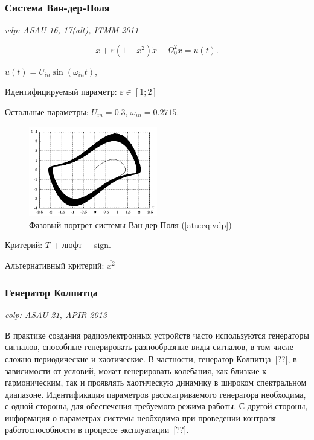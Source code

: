 \documentclass[a4paper,12pt]{article}
\newcommand{\LinkRef}[1]{ \textit{\color{red}#1} }
\begin{document}
\FloatBarrier
\subsubsection{Система Ван-дер-Поля} %

\LinkRef{
  vdp: ASAU-16, 17(alt), ITMM-2011
}

\begin{equation}
 \ddot{x} + \varepsilon (1-x^2)  \dot{x} + \Omega_0^2 x  = u(t) .
\label{atu:eq:vdp}
\end{equation}

\( u(t) = U_{in} \sin ( \omega_{in} t ) \),

Идентифицируемый параметр:
\( \varepsilon \in [1;2]  \)

Остальные параметры:
\(U_{in}=0.3\),
\(\omega_{in}=0.2715\).


\begin{figure}[htb!]
\centerline{\includegraphics[width=0.5\textwidth]{p/cha/vdp_phase.pdf} }
\caption{Фазовый портрет системы Ван-дер-Поля (\ref{atu:eq:vdp})}
\label{atu:f:vdp_phase}
\end{figure}

Критерий:
$\overline{T}$ + люфт + sign.

Альтернативный критерий:
$\overline{x^2}$


\FloatBarrier
\subsubsection{Генератор Колпитца} %

\LinkRef{
  colp: ASAU-21, APIR-2013
}

В  практике   создания   радиоэлектронных   устройств   часто   используются
генераторы сигналов, способные генерировать разнообразные виды  сигналов, в том числе
сложно-периодические и хаотические.
В частности, генератор  Колпитца~[??], в  зависимости   от   условий,   может
генерировать  колебания,  как  близкие  к  гармоническим,  так  и  проявлять
хаотическую  динамику  в  широком  спектральном   диапазоне.   Идентификация
параметров рассматриваемого генератора  необходима,  с  одной  стороны,  для
обеспечения  требуемого  режима  работы.  С  другой  стороны,  информация  о
параметрах системы необходима при проведении  контроля  работоспособности  в
процессе эксплуатации~[??].
\end{document}
